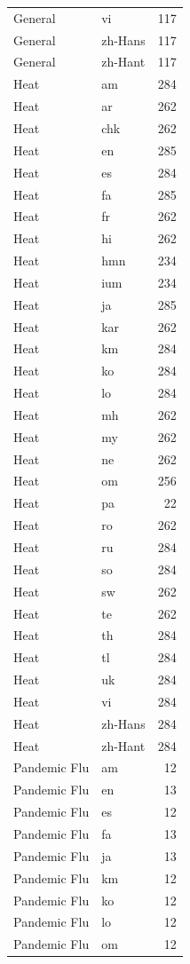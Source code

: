 \begin{longtable}{p{3cm} p{3cm} r}
General & vi & 117 \\
General & zh-Hans & 117 \\
General & zh-Hant & 117 \\
Heat & am & 284 \\
Heat & ar & 262 \\
Heat & chk & 262 \\
Heat & en & 285 \\
Heat & es & 284 \\
Heat & fa & 285 \\
Heat & fr & 262 \\
Heat & hi & 262 \\
Heat & hmn & 234 \\
Heat & ium & 234 \\
Heat & ja & 285 \\
Heat & kar & 262 \\
Heat & km & 284 \\
Heat & ko & 284 \\
Heat & lo & 284 \\
Heat & mh & 262 \\
Heat & my & 262 \\
Heat & ne & 262 \\
Heat & om & 256 \\
Heat & pa & 22 \\
Heat & ro & 262 \\
Heat & ru & 284 \\
Heat & so & 284 \\
Heat & sw & 262 \\
Heat & te & 262 \\
Heat & th & 284 \\
Heat & tl & 284 \\
Heat & uk & 284 \\
Heat & vi & 284 \\
Heat & zh-Hans & 284 \\
Heat & zh-Hant & 284 \\
Pandemic Flu & am & 12 \\
Pandemic Flu & en & 13 \\
Pandemic Flu & es & 12 \\
Pandemic Flu & fa & 13 \\
Pandemic Flu & ja & 13 \\
Pandemic Flu & km & 12 \\
Pandemic Flu & ko & 12 \\
Pandemic Flu & lo & 12 \\
Pandemic Flu & om & 12 \\

\end{longtable}
